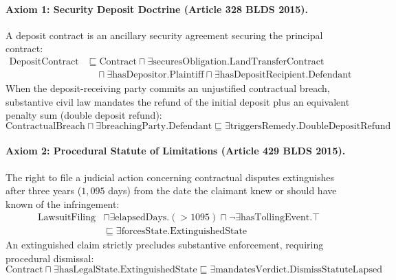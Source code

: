 \documentclass[11pt,a4paper]{article}
\begin{document}
\paragraph{Axiom 1: Security Deposit Doctrine (Article 328 BLDS 2015).}
A deposit contract is an ancillary security agreement securing the principal contract:
\begin{equation}
\label{eq:axiom1}
\begin{split}
\text{DepositContract} &\sqsubseteq \text{Contract} \sqcap \exists \text{securesObligation}.\text{LandTransferContract} \\
&\quad \sqcap \exists \text{hasDepositor}.\text{Plaintiff} \sqcap \exists \text{hasDepositRecipient}.\text{Defendant}
\end{split}
\end{equation}
When the deposit-receiving party commits an unjustified contractual breach, substantive civil law mandates the refund of the initial deposit plus an equivalent penalty sum (double deposit refund):
\begin{equation}
\label{eq:axiom2}
\text{ContractualBreach} \sqcap \exists \text{breachingParty}.\text{Defendant} \sqsubseteq \exists \text{triggersRemedy}.\text{DoubleDepositRefund}
\end{equation}

\paragraph{Axiom 2: Procedural Statute of Limitations (Article 429 BLDS 2015).}
The right to file a judicial action concerning contractual disputes extinguishes after three years ($1,095$ days) from the date the claimant knew or should have known of the infringement:
\begin{equation}
\label{eq:axiom3}
\begin{split}
\text{LawsuitFiling} &\sqcap \exists \text{elapsedDays}.(> 1095) \sqcap \neg \exists \text{hasTollingEvent}.\top \\
&\sqsubseteq \exists \text{forcesState}.\text{ExtinguishedState}
\end{split}
\end{equation}
An extinguished claim strictly precludes substantive enforcement, requiring procedural dismissal:
\begin{equation}
\label{eq:axiom4}
\text{Contract} \sqcap \exists \text{hasLegalState}.\text{ExtinguishedState} \sqsubseteq \exists \text{mandatesVerdict}.\text{DismissStatuteLapsed}
\end{equation}
\end{document}
